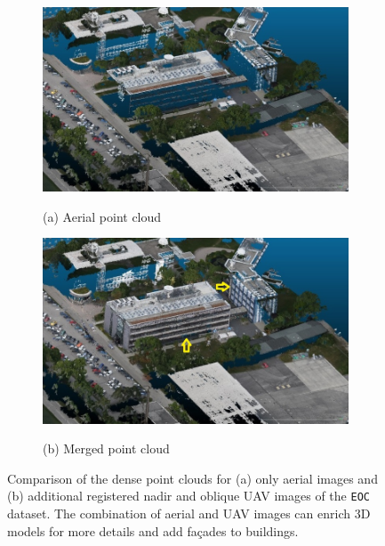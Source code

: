 \begin{figure}[tbp]
    \centering
       \begin{subfigure}[b]{0.496\columnwidth}
           \centering
           \includegraphics[width=\textwidth]{figures_5/eoc_pc_aerial.jpg}
           {{\small }}    
           \centerline{\small{(a) Aerial point cloud }}\medskip
       \end{subfigure}
       \hfill
       \begin{subfigure}[b]{0.495\columnwidth}  
           \centering 
           \includegraphics[width=\textwidth]{figures_5/eoc_pc_fused.jpg}         
           {{\small }}    
           \centerline{\small{(b) Merged point cloud}}\medskip
       \end{subfigure}
       {{\small }} 
       \caption{Comparison of the dense point clouds for (a) only aerial images and (b) additional registered nadir and oblique UAV images of the \texttt{EOC} dataset. The combination of aerial and UAV images can enrich 3D models for more details and add fa\c{c}ades to buildings. }
       \label{fig:eoc_pc}
\end{figure}

